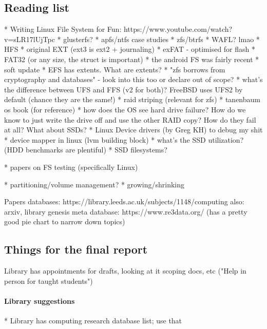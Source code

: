 \documentclass[a4paper]{article}
\begin{document}
    \subsection{Reading list}
        * Writing Linux File System for Fun: https://www.youtube.com/watch?v=sLR17lUjTpc
        * glusterfs?
        * apfs/ntfs case studies
        * zfs/btrfs
        * WAFL? lmao
        * HFS
        * original EXT (ext3 is ext2 + journaling)
        * exFAT - optimised for flash
        * FAT32 (or any size, the struct is important)
        * the android FS was fairly recent
        * soft update
        * EFS has extents. What are extents?
        * "zfs borrows from cryptography and databases" - look into this too or declare out of scope?
        * what's the difference between UFS and FFS (v2 for both)? FreeBSD uses UFS2 by default (chance they are the same!)
        * raid striping (relevant for zfs)
        * tanenbaum os book (for reference)
        * how does the OS see hard drive failure? How do we know to just write the drive off and use the other RAID copy?
          How do they fail at all? What about SSDs?
        * Linux Device drivers (by Greg KH) to debug my shit
        * device mapper in linux (lvm building block)
        * what's the SSD utilization? (HDD benchmarks are plentiful)
        * SSD filesystems?

        * papers on FS testing (specifically Linux)

        * partitioning/volume management?
        * growing/shrinking

        Papers databases: https://library.leeds.ac.uk/subjects/1148/computing
        also: arxiv, library genesis
        meta database: https://www.re3data.org/ (has a pretty good pie chart to narrow down topics)

    \subsection{Things for the final report}
        Library has appointments for drafts, looking at it scoping docs, etc ("Help in person for taught students")
        \paragraph{Library suggestions}
        * Library has computing research database list; use that
\end{document}

